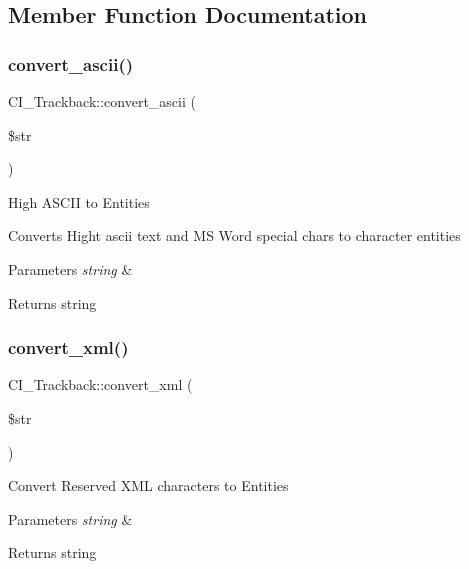 \subsection{Member Function Documentation}
\mbox{\label{class_c_i___trackback_a58749ae6b6bd5b00c22c15d2e5b2d8f9}} 
\subsubsection{\texorpdfstring{convert\+\_\+ascii()}{convert\_ascii()}}
{\footnotesize\ttfamily C\+I\+\_\+\+Trackback\+::convert\+\_\+ascii (\begin{DoxyParamCaption}\item[{}]{\$str }\end{DoxyParamCaption})}

High A\+S\+C\+II to Entities

Converts Hight ascii text and MS Word special chars to character entities


\begin{DoxyParams}{Parameters}
{\em string} & \\
\hline
\end{DoxyParams}
\begin{DoxyReturn}{Returns}
string 
\end{DoxyReturn}
\mbox{\label{class_c_i___trackback_a9863b761ea56c39b4ab729cb092126d9}} 
\subsubsection{\texorpdfstring{convert\+\_\+xml()}{convert\_xml()}}
{\footnotesize\ttfamily C\+I\+\_\+\+Trackback\+::convert\+\_\+xml (\begin{DoxyParamCaption}\item[{}]{\$str }\end{DoxyParamCaption})}

Convert Reserved X\+ML characters to Entities


\begin{DoxyParams}{Parameters}
{\em string} & \\
\hline
\end{DoxyParams}
\begin{DoxyReturn}{Returns}
string 
\end{DoxyReturn}
\mbox{\label{class_c_i___trackback_a8a11fd864ef076bc397847d3f6652934}} 
